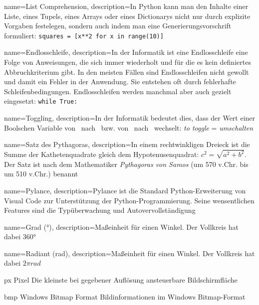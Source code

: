 {
	name={List Comprehension},
	description={In Python kann man den Inhalte einer Liste, eines Tupels, eines Arrays oder eines Dictionarys nicht nur durch explizite Vorgaben festelegen, sondern auch indem man eine Generierungsvorschrift formuliert: \texttt{squares = [x**2 for x in range(10)]}} 
}

{
	name={Endlosschleife},
	description={In der Informatik ist eine Endlosschleife eine Folge von Anweisungen, die sich immer wiederholt und für die es kein definiertes Abbruchkriterium gibt. In den meisten Fällen sind Endlosschleifen nicht gewollt und damit ein Fehler in der Anwendung. Sie entstehen oft durch fehlerhafte Schleifenbedingungen. Endlosschleifen werden manchmal aber auch gezielt eingesetzt: \texttt{while True:}} 
}

{
	name={Toggling},
	description={In der Informatik bedeutet dies, dass der Wert einer Boolschen Variable von \true\ nach \false\ bzw. von \false\ nach \true\ wechselt: \emph{to toggle} = \emph{umschalten}} 
}

{
	name={Satz des Pythagoras},
	description={In einem rechtwinkligen Dreieck ist die Summe der Kathetenquadrate gleich dem Hypotenusenquadrat: $c^2 = \sqrt{a^2 + b^2}$. Der Satz ist nach dem Mathematiker \emph{Pythagoras von Samos} (um 570 v.Chr. bis um 510 v.Chr.) benannt} 
}

{
	name={Pylance},
	description={Pylance ist die Standard Python-Erweiterung von Visual Code zur Unterstützung der Python-Programmierung. Seine wensentlichen Features sind die Typüberwachung und Autovervollständigung} 
}

{
	name={Grad (°)},
	description={Maßeinheit für einen Winkel. Der Vollkreis hat dabei $360°$} 
}

{
	name={Radiant (rad)},
	description={Maßeinheit für einen Winkel. Der Vollkreis hat dabei $2\pi rad$} 
}




  {px}            %
  {Pixel}  %
  {Die kleinste bei gegebener Auflösung ansteuerbare Bildschirmfläche} %

  {bmp}            %
  {Windows Bitmap Format}  %
  {Bildinformationen im Windows Bitmap-Format} %

